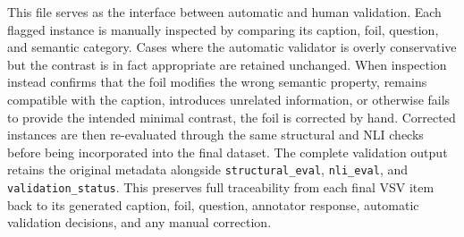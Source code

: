 This file serves as the interface between automatic and human validation. Each flagged instance is manually inspected by comparing its caption, foil, question, and semantic category. Cases where the automatic validator is overly conservative but the contrast is in fact appropriate are retained unchanged. When inspection instead confirms that the foil modifies the wrong semantic property, remains compatible with the caption, introduces unrelated information, or otherwise fails to provide the intended minimal contrast, the foil is corrected by hand. Corrected instances are then re-evaluated through the same structural and NLI checks before being incorporated into the final dataset.
The complete validation output retains the original metadata alongside \texttt{structural\_eval}, \texttt{nli\_eval}, and \texttt{validation\_status}. This preserves full traceability from each final \ac{VSV} item back to its generated caption, foil, question, annotator response, automatic validation decisions, and any manual correction.
